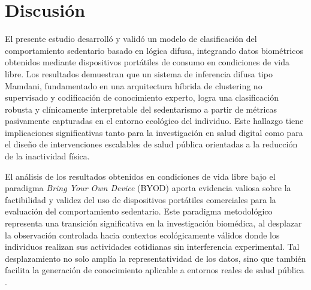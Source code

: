 
\chapter{Discusión}
\label{cap:discusion}


\noindent El presente estudio desarrolló y validó un modelo de clasificación del comportamiento sedentario basado en lógica difusa, integrando datos biométricos obtenidos mediante dispositivos portátiles de consumo en condiciones de vida libre. Los resultados demuestran que un sistema de inferencia difusa tipo Mamdani, fundamentado en una arquitectura híbrida de clustering no supervisado y codificación de conocimiento experto, logra una clasificación robusta y clínicamente interpretable del sedentarismo a partir de métricas pasivamente capturadas en el entorno ecológico del individuo. Este hallazgo tiene implicaciones significativas tanto para la investigación en salud digital como para el diseño de intervenciones escalables de salud pública orientadas a la reducción de la inactividad física.

El análisis de los resultados obtenidos en condiciones de vida libre bajo el paradigma \textit{Bring Your Own Device} (BYOD) aporta evidencia valiosa sobre la factibilidad y validez del uso de dispositivos portátiles comerciales para la evaluación del comportamiento sedentario. Este paradigma metodológico representa una transición significativa en la investigación biomédica, al desplazar la observación controlada hacia contextos ecológicamente válidos donde los individuos realizan sus actividades cotidianas sin interferencia experimental. Tal desplazamiento no solo amplía la representatividad de los datos, sino que también facilita la generación de conocimiento aplicable a entornos reales de salud pública \cite{Doherty2021,Liu2022}.

